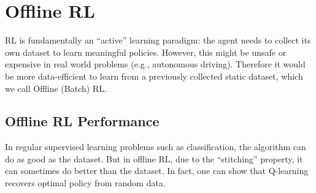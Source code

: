 \chapter{Offline RL}
RL is fundamentally an “active” learning paradigm: the agent needs
to collect its own dataset to learn meaningful policies. However, this might be unsafe or expensive in real world problems (e.g., autonomous driving). Therefore it would be more data-efficient to learn from a previously collected static dataset, which we call Offline (Batch) RL.

\section{Offline RL Performance}
In regular supervised learning problems such as classification, the algorithm can do as good as the dataset. But in offline RL, due to the ``stitching'' property, it can sometimes do better than the dataset. In fact, one can show that Q-learning recovers optimal policy from random data.
